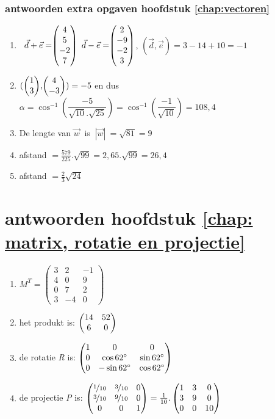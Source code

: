\documentclass[hidelinks, a4wide, 12pt,  twoside]{book}
\begin{document}
\subsubsection{antwoorden extra opgaven hoofdstuk \ref{chap:vectoren}}
\begin{enumerate}
	
	\item  \ $ \vec{d} + \vec{e}  = \vecvier{4}{5}{-2}{7} $   \qquad $ \vec{d} - \vec{e} = \vecvier{2}{-9}{-2}{3} $,   \qquad $  (\vec{d} , \vec{e}) = 3-14+10 = -1 $ 
	
	\item $  (\vectwee{1}{3} , \vectwee{4}{-3}) = -5 $  en dus $\alpha = \cos ^{-1} (\dfrac{-5}{\sqrt{10}.\sqrt{25}})= \cos ^{-1} (\dfrac{-1}{\sqrt{10}}) = 108,4 $ 
	
	\item De lengte van  $  \vec{w} \ $ is $ \ |\vec{w}| \  =  \sqrt{81} = 9 $
	
	\item afstand  $ = \frac{579}{225}.\sqrt{99} = 2,65 . \sqrt{99} = 26,4 $
	
	\item    afstand  $ = \frac{2}{3}\sqrt{24} $
\end{enumerate}	

\section{antwoorden  hoofdstuk \ref{chap: matrix, rotatie en projectie}}
\begin{enumerate}
	\item  
	$ M^{T} =	\begin{pmatrix}
	3 & 2 & -1\\
	4&0&9\\
	0&7&2\\
	3&-4&0 
	\end{pmatrix} $
	\item
	het produkt is:  $ \begin{pmatrix} 14&52 \\ 6&0 \end{pmatrix}  $
	\item
	de rotatie \textit{R} is:  
	$ \begin{pmatrix} 1&0&0 \\ 0&\cos  62 \degree  & \sin 62 \degree \\ 0& -\sin 62 \degree & \cos 62 \degree \end{pmatrix}  $
	\item
	de projectie \textit{P} is:  
	$ \begin{pmatrix} \nicefrac{1}{10}&\nicefrac{3}{10}&0 \\ \nicefrac{3}{10}&\nicefrac{9}{10}  & 0 \\ 0& 0 & 1 \end{pmatrix}  
	= \frac{1}{10} .\begin{pmatrix} 1&3&0 \\ 3&9  & 0 \\ 0& 0 & 10 \end{pmatrix} $    
	
\end{enumerate}
\end{document}
